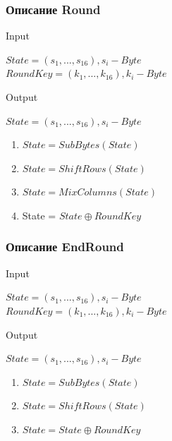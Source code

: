 \documentclass[10pt, typeface=serif(roman), pdf,hyperref={unicode}, aspectratio=169]{beamer}
\begin{document}
\begin{frame}
	\frametitle{Описание Round}
	\begin{description}
		\begin{block}
			{
				Input
			}
			\item $ State= (s_1,...,s_16), s_i - Byte $ \\
			$ RoundKey = (k_1,...,k_16), k_i - Byte$\\
		\end{block}
		\begin{block}
			{
				Output
			}
			\item $ State= (s_1,...,s_16), s_i - Byte $\\
		\end{block}
	\end{description}
	\begin{enumerate}
		\item $State = SubBytes(State)$
		\item $State = ShiftRows (State)$
		\item $State = MixColumns(State)$
		\item State = $State \oplus RoundKey$
	\end{enumerate}
\end{frame}



\begin{frame}
	\frametitle{Описание EndRound}
	\begin{description}
		\begin{block}
			{
				Input
			}
			\item $ State= (s_1,...,s_16), s_i - Byte $ \\
			$ RoundKey = (k_1,...,k_16), k_i - Byte$\\
		\end{block}
		\begin{block}
			{
				Output
			}
			\item $ State= (s_1,...,s_16), s_i - Byte $\\
		\end{block}
	\end{description}
	\begin{enumerate}
		\item $State = SubBytes(State)$
		\item $State = ShiftRows (State)$
		\item $State = State \oplus RoundKey $
	\end{enumerate}
\end{frame}
\end{document}
